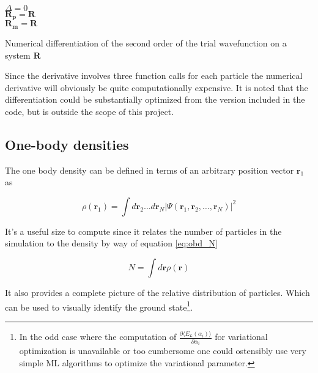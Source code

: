 \begin{algorithm}
\BlankLine
$\Delta = 0$ \\
$\mathbf{R_p} = \mathbf{R}$\\
$\mathbf{R_m} = \mathbf{R}$\\
\BlankLine
{}
\BlankLine
\caption{Numerical differentiation of the second order of the trial wavefunction on a system $\mathbf{R}$}\label{alg:nd}
\end{algorithm} 

Since the derivative involves three function calls for each particle the numerical derivative will obviously be quite computationally expensive. It is noted  that the differentiation could be substantially optimized from the version included in the code, but is outside the scope of this project. 


\subsection{One-body densities}
The one body density can be defined in terms of an arbitrary position vector $\mathbf{r}_1$ as 

\begin{equation}\label{eq:obd}
\rho(\mathbf{r}_1) = \int d\mathbf{r}_2 \ldots d\mathbf{r}_N |\Psi(\mathbf{r}_1, \mathbf{r}_2, \ldots, \mathbf{r}_N)|^2
\end{equation}

It's a useful size to compute since it relates the number of particles in the simulation to the density by way of equation \ref{eq:obd_N}

\begin{equation}\label{eq:obd_N}
N = \int d\mathbf{r}\rho(\mathbf{r})
\end{equation}

It also provides a complete picture of the relative distribution of particles. Which can be used to visually identify the ground state\footnote{In the odd case where the computation of $\frac{\partial \langle E_L (\alpha_i) \rangle}{\partial \alpha_i}$ for variational optimization is unavailable or too cumbersome one could ostensibly use very simple ML algorithms to optimize the variational parameter.}.


